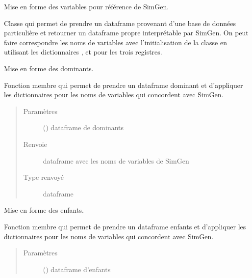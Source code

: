\documentclass[letterpaper,10pt,french]{sphinxmanual}
\begin{document}
\begin{fulllineitems}
\label{\detokenize{code:simgen.parse}}
Mise en forme des variables pour référence de SimGen.

Classe qui permet de prendre un dataframe provenant d’une base de données particulière et retourner un dataframe propre interprétable par SimGen. On peut faire correspondre les noms de variables avec l’initialisation de la classe en utilisant les dictionnaires ,  et  pour les trois registres.

\begin{fulllineitems}
\label{\detokenize{code:simgen.parse.dominants}}
Mise en forme des dominants.

Fonction membre qui permet de prendre un dataframe dominant et d’appliquer les dictionnaires  pour les noms de variables qui concordent avec SimGen.
\begin{quote}\begin{description}
\item[{Paramètres}] \leavevmode
{} () \textendash{} dataframe de dominants

\item[{Renvoie}] \leavevmode
dataframe avec les noms de variables de SimGen

\item[{Type renvoyé}] \leavevmode
dataframe

\end{description}\end{quote}

\end{fulllineitems}


\begin{fulllineitems}
\label{\detokenize{code:simgen.parse.kids}}
Mise en forme des enfants.

Fonction membre qui permet de prendre un dataframe enfants et d’appliquer les dictionnaires  pour les noms de variables qui concordent avec SimGen.
\begin{quote}\begin{description}
\item[{Paramètres}] \leavevmode
{} () \textendash{} dataframe d’enfants


\end{description}
\end{quote}
\end{fulllineitems}
\end{fulllineitems}
\end{document}
